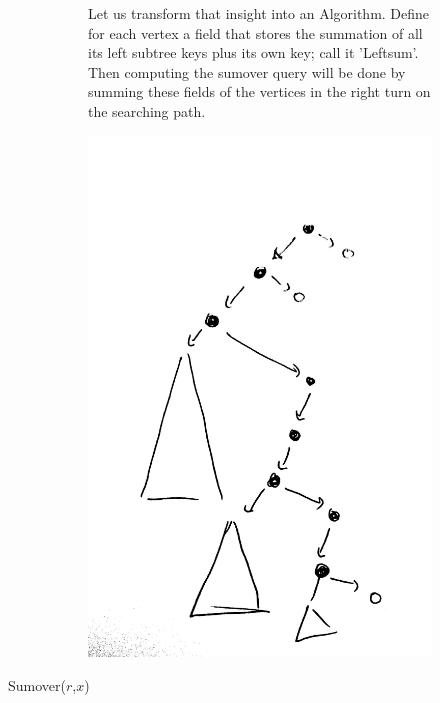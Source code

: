 \begin{figure}[H]
\begin{subfigure}[b]{0.47\textwidth}
Let us transform that insight into an 
Algorithm. Define for each vertex a field that stores the summation of all its left subtree keys plus its own key; call it 'Leftsum'.  
Then computing the sumover query will be done by summing these fields of the vertices in the right turn on the searching path. 
\end{subfigure} 
\hfill
\begin{subfigure}[b]{0.49\textwidth}
  \includegraphics[scale=0.07]{oavl-q.png}
   \end{subfigure} 
   \hfill
\end{figure}


\begin{algbox}{Sumover($r$,$x$)}
  \begin{algorithm}[H]
  \end{algorithm}
\end{algbox}

